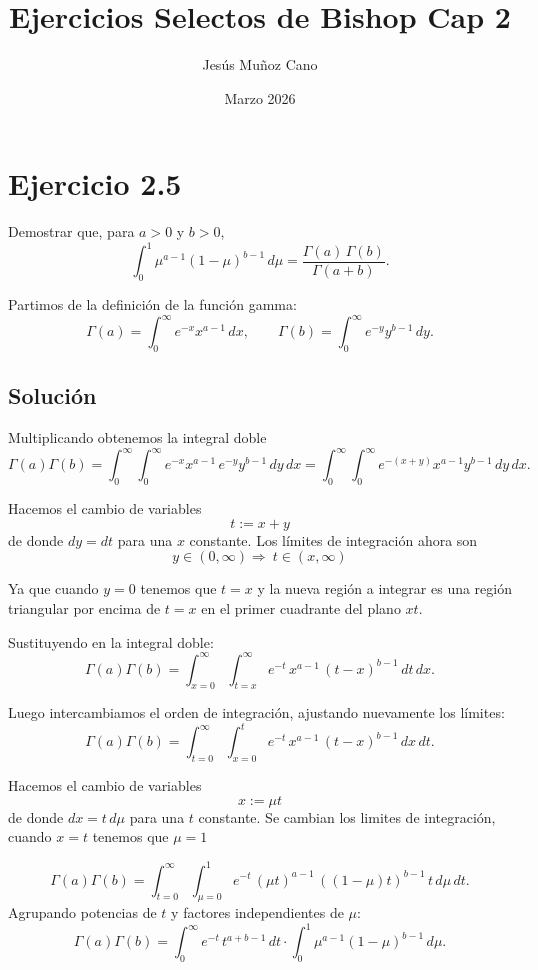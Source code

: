 \documentclass{article}
\title{Ejercicios Selectos de Bishop Cap 2}
\author{Jesús Muñoz Cano}
\date{Marzo 2026}
\begin{document}
\maketitle

\section*{Ejercicio 2.5}

Demostrar que, para \(a>0\) y \(b>0\),
\[
\int_{0}^{1} \mu^{a-1}(1-\mu)^{b-1}\,d\mu
=\frac{\Gamma(a)\,\Gamma(b)}{\Gamma(a+b)}.
\]

Partimos de la definición de la función gamma:
\[
\Gamma(a)=\int_{0}^{\infty} e^{-x}x^{a-1}\,dx,\qquad
\Gamma(b)=\int_{0}^{\infty} e^{-y}y^{b-1}\,dy.
\]

\subsection*{Solución}
Multiplicando obtenemos la integral doble
\[
\Gamma(a)\Gamma(b)
=\int_{0}^{\infty}\int_{0}^{\infty} e^{-x}x^{a-1}\, e^{-y}y^{b-1}\,dy\,dx
=\int_{0}^{\infty}\int_{0}^{\infty} e^{-(x+y)} x^{a-1} y^{b-1}\,dy\,dx.
\]

Hacemos el cambio de variables \[t:=x+y\]
de donde \(dy=dt\) para una \(x\) constante. Los límites de integración ahora son
\[
y\in(0,\infty) \Longrightarrow\ t\in(x,\infty)
\]

Ya que cuando $ y = 0 $ tenemos que $ t = x $ y la nueva región a integrar es una región triangular por encima de $t = x$ en el primer cuadrante del plano $xt$. 

Sustituyendo en la integral doble:
\[
\Gamma(a)\Gamma(b)
=\int_{x=0}^{\infty}\int_{t=x}^{\infty}
e^{-t}\,x^{a-1}\,(t-x)^{b-1}\,dt\,dx.
\]

Luego intercambiamos el orden de integración, ajustando nuevamente los límites:
\[
\Gamma(a)\Gamma(b)
=\int_{t=0}^{\infty}\int_{x=0}^{t}
e^{-t}\,x^{a-1}\,(t-x)^{b-1}\,dx\,dt.
\]

Hacemos el cambio de variables \[x:=\mu t\]
de donde \(dx=t\,d\mu\) para una \(t\) constante. Se cambian los limites de integración, cuando $ x = t $ tenemos que $ \mu = 1 $

\[
\Gamma(a)\Gamma(b)
=\int_{t=0}^{\infty}\int_{\mu=0}^{1}
e^{-t}\,(\mu t)^{a-1}\,((1-\mu)t)^{b-1}\,t\,d\mu\,dt.
\]
Agrupando potencias de \(t\) y factores independientes de \(\mu\):
\[
\Gamma(a)\Gamma(b)
=\int_{0}^{\infty} e^{-t}\,t^{a+b-1}\,dt
\cdot
\int_{0}^{1} \mu^{a-1}(1-\mu)^{b-1}\,d\mu.
\]
\end{document}
